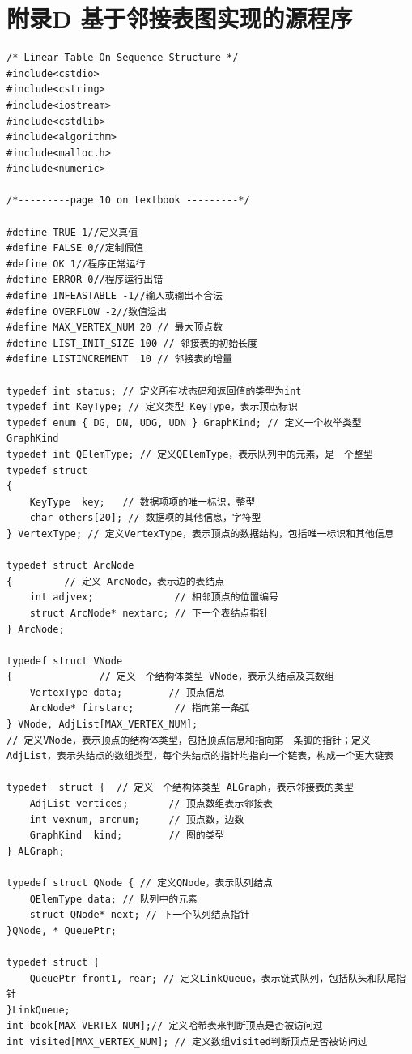 \documentclass[supercite]{Experimental_Report}
\theoremstyle{definition}
\begin{document}
\section{附录D 基于邻接表图实现的源程序}
\begin{lstlisting}[title =相关定义,frame=none]
/* Linear Table On Sequence Structure */
#include<cstdio> 
#include<cstring> 
#include<iostream> 
#include<cstdlib> 
#include<algorithm> 
#include<malloc.h> 
#include<numeric> 

/*---------page 10 on textbook ---------*/

#define TRUE 1//定义真值 
#define FALSE 0//定制假值 
#define OK 1//程序正常运行 
#define ERROR 0//程序运行出错 
#define INFEASTABLE -1//输入或输出不合法 
#define OVERFLOW -2//数值溢出 
#define MAX_VERTEX_NUM 20 // 最大顶点数
#define LIST_INIT_SIZE 100 // 邻接表的初始长度
#define LISTINCREMENT  10 // 邻接表的增量

typedef int status; // 定义所有状态码和返回值的类型为int
typedef int KeyType; // 定义类型 KeyType，表示顶点标识
typedef enum { DG, DN, UDG, UDN } GraphKind; // 定义一个枚举类型 GraphKind
typedef int QElemType; // 定义QElemType，表示队列中的元素，是一个整型
typedef struct 
{
	KeyType  key;   // 数据项项的唯一标识，整型
	char others[20]; // 数据项的其他信息，字符型
} VertexType; // 定义VertexType，表示顶点的数据结构，包括唯一标识和其他信息

typedef struct ArcNode
{         // 定义 ArcNode，表示边的表结点
	int adjvex;              // 相邻顶点的位置编号 
	struct ArcNode* nextarc; // 下一个表结点指针
} ArcNode;

typedef struct VNode 
{               // 定义一个结构体类型 VNode，表示头结点及其数组
	VertexType data;        // 顶点信息
	ArcNode* firstarc;       // 指向第一条弧
} VNode, AdjList[MAX_VERTEX_NUM]; 
// 定义VNode，表示顶点的结构体类型，包括顶点信息和指向第一条弧的指针；定义AdjList，表示头结点的数组类型，每个头结点的指针均指向一个链表，构成一个更大链表 

typedef  struct {  // 定义一个结构体类型 ALGraph，表示邻接表的类型
	AdjList vertices;       // 顶点数组表示邻接表
	int vexnum, arcnum;     // 顶点数，边数
	GraphKind  kind;        // 图的类型
} ALGraph;

typedef struct QNode { // 定义QNode，表示队列结点
	QElemType data; // 队列中的元素
	struct QNode* next; // 下一个队列结点指针
}QNode, * QueuePtr;

typedef struct {
	QueuePtr front1, rear; // 定义LinkQueue，表示链式队列，包括队头和队尾指针
}LinkQueue;
int book[MAX_VERTEX_NUM];// 定义哈希表来判断顶点是否被访问过
int visited[MAX_VERTEX_NUM]; // 定义数组visited判断顶点是否被访问过


\end{lstlisting}
\end{document}
